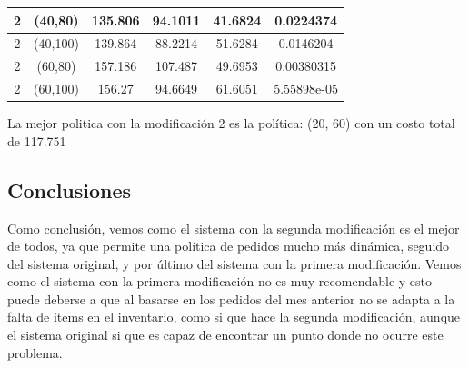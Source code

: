 \documentclass[12pt, spanish]{article}
\begin{document}
\begin{table}[H]
{\begin{tabular}{|c|c|c|c|c|c|}
2                     & (40,80)           & 135.806              & 94.1011                  & 41.6824                         & 0.0224374                 \\ \hline
2                     & (40,100)          & 139.864              & 88.2214                  & 51.6284                         & 0.0146204                 \\ \hline
2                     & (60,80)           & 157.186              & 107.487                  & 49.6953                         & 0.00380315                \\ \hline
2                     & (60,100)          & 156.27               & 94.6649                  & 61.6051                         & 5.55898e-05               \\ \hline
\end{tabular}
}
\end{table}

La mejor politica con la modificación 2 es la política: (20, 60) con un costo total de 117.751


\subsection{Conclusiones}


Como conclusión, vemos como el sistema con la segunda modificación es el mejor de todos, ya que permite una política de pedidos mucho más dinámica, seguido del sistema original, y por último del sistema con la primera modificación. Vemos como el sistema con la primera modificación no es muy recomendable y esto puede deberse a que al basarse en los pedidos del mes anterior no se adapta a la falta de items en el inventario, como si que hace la segunda modificación, aunque el sistema original si que es capaz de encontrar un punto donde no ocurre este problema.




%
%
\end{document}
